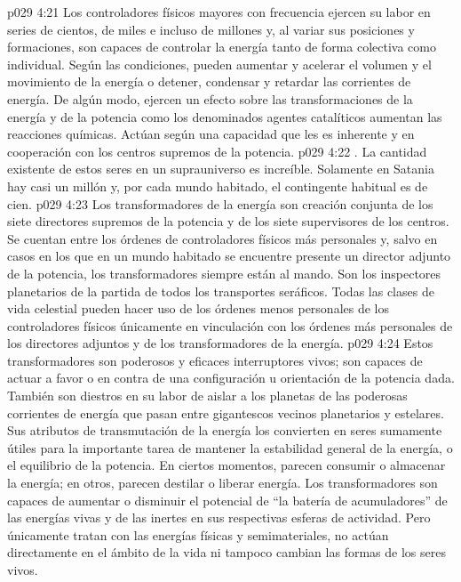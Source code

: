 \vs p029 4:21 Los controladores físicos mayores con frecuencia ejercen su labor en series de cientos, de miles e incluso de millones y, al variar sus posiciones y formaciones, son capaces de controlar la energía tanto de forma colectiva como individual. Según las condiciones, pueden aumentar y acelerar el volumen y el movimiento de la energía o detener, condensar y retardar las corrientes de energía. De algún modo, ejercen un efecto sobre las transformaciones de la energía y de la potencia como los denominados agentes catalíticos aumentan las reacciones químicas. Actúan según una capacidad que les es inherente y en cooperación con los centros supremos de la potencia.
\vs p029 4:22 . La cantidad existente de estos seres en un suprauniverso es increíble. Solamente en Satania hay casi un millón y, por cada mundo habitado, el contingente habitual es de cien.
\vs p029 4:23 Los transformadores de la energía son creación conjunta de los siete directores supremos de la potencia y de los siete supervisores de los centros. Se cuentan entre los órdenes de controladores físicos más personales y, salvo en casos en los que en un mundo habitado se encuentre presente un director adjunto de la potencia, los transformadores siempre están al mando. Son los inspectores planetarios de la partida de todos los transportes seráficos. Todas las clases de vida celestial pueden hacer uso de los órdenes menos personales de los controladores físicos únicamente en vinculación con los órdenes más personales de los directores adjuntos y de los transformadores de la energía.
\vs p029 4:24 Estos transformadores son poderosos y eficaces interruptores vivos; son capaces de actuar a favor o en contra de una configuración u orientación de la potencia dada. También son diestros en su labor de aislar a los planetas de las poderosas corrientes de energía que pasan entre gigantescos vecinos planetarios y estelares. Sus atributos de transmutación de la energía los convierten en seres sumamente útiles para la importante tarea de mantener la estabilidad general de la energía, o el equilibrio de la potencia. En ciertos momentos, parecen consumir o almacenar la energía; en otros, parecen destilar o liberar energía. Los transformadores son capaces de aumentar o disminuir el potencial de “la batería de acumuladores” de las energías vivas y de las inertes en sus respectivas esferas de actividad. Pero únicamente tratan con las energías físicas y semimateriales, no actúan directamente en el ámbito de la vida ni tampoco cambian las formas de los seres vivos.

